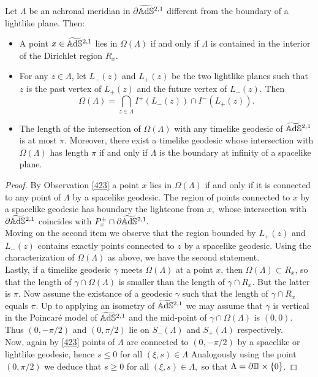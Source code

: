 \begin{proposition}\label{432}
    Let $\Lambda$ be an achronal meridian in $\partial\widetilde{\mathbb{A}\mathrm{d}\mathbb{S}}{}^{2,1}$ different from the boundary of a lightlike plane. Then: 
        \begin{itemize}
            \item A point $x\in\widetilde{\mathbb{A}\mathrm{d}\mathbb{S}}{}^{2,1}$ lies in $\Omega(\Lambda)$ if and only if $\Lambda$ is contained in the interior of the Dirichlet region $R_x$. 
            \item For any $z\in\Lambda$, let $L_-(z)$ and $L_+(z)$ be the two lightlike planes such that $z$ is the past vertex of $L_+(z)$ and the future vertex of $L_-(z)$. Then 
            \[
                \Omega(\Lambda)=\bigcap_{z\in\Lambda}I^+(L_-(z))\cap I^{-}(L_+(z)).
            \] 
            \item The length of the intersection of $\Omega(\Lambda)$ with any timelike geodesic of $\widetilde{\mathbb{A}\mathrm{d}\mathbb{S}}{}^{2,1}$ is at most $\pi.$ Moreover, there exist a timelike geodesic whose intersection with $\Omega(\Lambda)$ has length $\pi$ if and only if $\Lambda$ is the boundary at infinity of a spacelike plane. 
        \end{itemize}
\end{proposition}
\begin{proof}
    By Observation \ref{423} a point $x$ lies in $\Omega(\Lambda)$ if and only if it is connected to any point of $\Lambda$ by a spacelike geodesic. The region of points connected to $x$ by a spacelike geodesic has boundary the lightcone from $x,$ whose intersection with $\partial\widetilde{\mathbb{A}\mathrm{d}\mathbb{S}}{}^{2,1}$ coincides with $P_x^\pm\cap \partial\widetilde{\mathbb{A}\mathrm{d}\mathbb{S}}{}^{2,1}.$\\
    Moving on the second item we observe that the region bounded by $L_+(z)$ and $L_-(z)$ contains exactly points connected to $z$ by a spacelike geodesic. Using the characterization of $\Omega(\Lambda)$ as above, we have the second statement.   \\
    Lastly, if a timelike geodesic $\gamma$ meets $\Omega(\Lambda)$ at a point $x$, then $\Omega(\Lambda)\subset R_x$, so that the length of $\gamma\cap\Omega(\Lambda)$ is smaller than the length of $\gamma\cap R_x$. But the latter is $\pi.$ Now assume the existance of a geodesic $\gamma$ such that the length of $\gamma\cap R_x$ equals $\pi.$ Up to applying an isometry of $\widetilde{\mathbb{A}\mathrm{d}\mathbb{S}}{}^{2,1}$ we may assume that $\gamma$ is vertical in the Poincaré model of $\widetilde{\mathbb{A}\mathrm{d}\mathbb{S}}{}^{2,1}$ and the mid-point of $\gamma\cap\Omega(\Lambda)$ is $(0,0)$. Thus $(0,-\pi/2)$ and $(0,\pi/2)$ lie on $S_-(\Lambda)$ and $S_+(\Lambda)$ respectively. \\
    Now, again by \ref{423} points of $\Lambda$ are connected to $(0,-\pi/2)$ by a spacelike or lightlike geodesic, hence $s\leq 0$ for all $(\xi,s)\in\Lambda$ Analogously using the point $(0,\pi/2)$ we deduce that $s\geq 0$ for all $(\xi,s)\in\Lambda,$ so that $\Lambda=\partial\mathbb{D}\times\{0\}$.
\end{proof}

